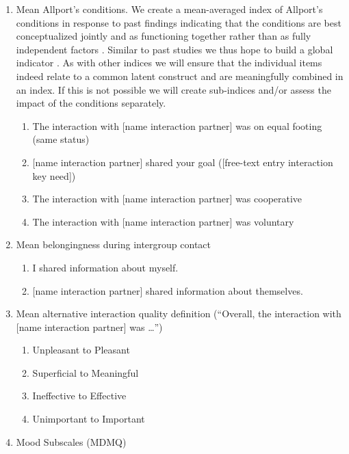\documentclass[]{article}
\providecommand{\tightlist}{%
\setlength{\itemsep}{0pt}\setlength{\parskip}{0pt}}
\begin{document}
\begin{enumerate}
\def\labelenumi{\arabic{enumi}.}
\tightlist
\item
  Mean Allport's conditions. We create a mean-averaged index of
  Allport's conditions in response to past findings indicating that the
  conditions are best conceptualized jointly and as functioning together
  rather than as fully independent factors
  \citep[p.~766]{Pettigrew2006}. Similar to past studies we thus hope to
  build a global indicator \citep[e.g., see][]{Pettigrew2006}. As with
  other indices we will ensure that the individual items indeed relate
  to a common latent construct and are meaningfully combined in an
  index. If this is not possible we will create sub-indices and/or
  assess the impact of the conditions separately.

  \begin{enumerate}
  \def\labelenumii{\alph{enumii}.}
  \tightlist
  \item
    The interaction with {[}name interaction partner{]} was on equal
    footing (same status)
  \item
    {[}name interaction partner{]} shared your goal ({[}free-text entry
    interaction key need{]})
  \item
    The interaction with {[}name interaction partner{]} was cooperative
  \item
    The interaction with {[}name interaction partner{]} was voluntary
  \end{enumerate}
\item
  Mean belongingness during intergroup contact

  \begin{enumerate}
  \def\labelenumii{\alph{enumii}.}
  \tightlist
  \item
    I shared information about myself.
  \item
    {[}name interaction partner{]} shared information about themselves.
  \end{enumerate}
\item
  Mean alternative interaction quality definition (``Overall, the
  interaction with {[}name interaction partner{]} was \ldots{}'')

  \begin{enumerate}
  \def\labelenumii{\alph{enumii}.}
  \tightlist
  \item
    Unpleasant to Pleasant
  \item
    Superficial to Meaningful
  \item
    Ineffective to Effective
  \item
    Unimportant to Important
  \end{enumerate}
\item
  Mood Subscales (MDMQ)


\end{enumerate}
\end{document}
